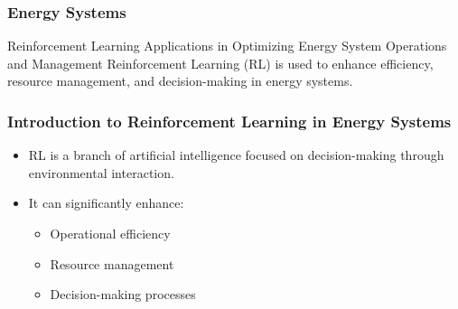 \documentclass[aspectratio=169]{beamer}
\begin{document}
\begin{frame}[fragile]
  \frametitle{Energy Systems}
  \begin{block}{Reinforcement Learning Applications in Optimizing Energy System Operations and Management}
    Reinforcement Learning (RL) is used to enhance efficiency, resource management, and decision-making in energy systems.
  \end{block}
\end{frame}

\begin{frame}[fragile]
  \frametitle{Introduction to Reinforcement Learning in Energy Systems}
  \begin{itemize}
    \item RL is a branch of artificial intelligence focused on decision-making through environmental interaction.
    \item It can significantly enhance:
      \begin{itemize}
        \item Operational efficiency
        \item Resource management
        \item Decision-making processes
      \end{itemize}
  \end{itemize}
\end{frame}
\end{document}
